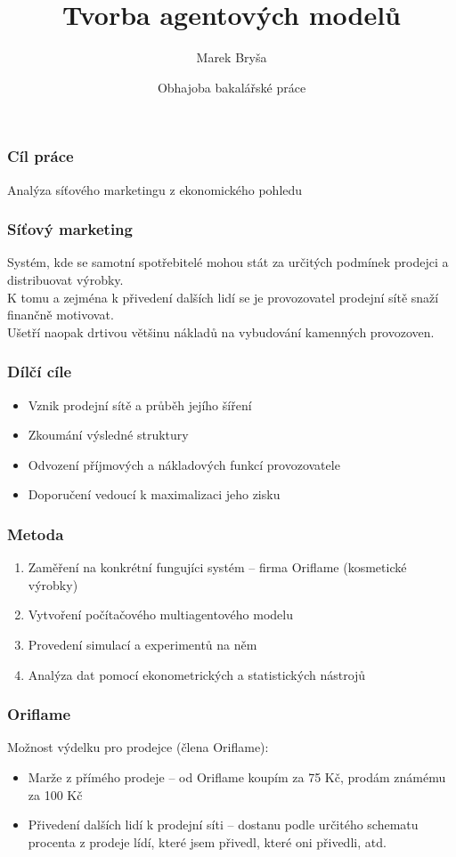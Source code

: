 \documentclass[xcolor=dvipsnames]{beamer}
\title{Tvorba agentových modelů}
\author{Marek Bryša}
\institute
{
Masarykova Univerzita\\
Přírodovědecká fakulta\\
Ústav matematiky a statistiky
}
\date{Obhajoba bakalářské práce}
\begin{document}
  \frame{\titlepage}
  \begin{frame}
    \frametitle{Cíl práce}
    Analýza síťového marketingu z ekonomického pohledu\\
  \end{frame}
  \begin{frame}
    \frametitle{Síťový marketing}
    Systém, kde se samotní spotřebitelé mohou stát za určitých podmínek prodejci
a distribuovat výrobky.\\
    K tomu a zejména k přivedení dalších lidí se je provozovatel prodejní sítě snaží finančně motivovat.\\
    Ušetří naopak drtivou většinu nákladů na vybudování kamenných provozoven. 
  \end{frame}
  \begin{frame}
    \frametitle{Dílčí cíle}
    \begin{itemize}
      \item Vznik prodejní sítě a průběh jejího šíření
      \item Zkoumání výsledné struktury
      \item Odvození příjmových a nákladových funkcí provozovatele
      \item Doporučení vedoucí k maximalizaci jeho zisku
    \end{itemize}
  \end{frame}
  \begin{frame}
    \frametitle{Metoda}
    \begin{enumerate}
      \item Zaměření na konkrétní fungujíci systém -- firma Oriflame (kosmetické výrobky)
      \item Vytvoření počítačového multiagentového modelu
      \item Provedení simulací a experimentů na něm
      \item Analýza dat pomocí ekonometrických a statistických nástrojů

    \end{enumerate}

  \end{frame}
  \begin{frame}
    \frametitle{Oriflame}
    Možnost výdelku pro prodejce (člena Oriflame):
    \begin{itemize}
      \item Marže z přímého prodeje -- od Oriflame koupím za 75 Kč, prodám známému za 100 Kč
      \item Přivedení dalších lidí k prodejní síti -- dostanu podle určitého schematu procenta z prodeje lídí, které jsem přivedl, které oni přivedli, atd.
    \end{itemize}
  \end{frame}
\end{document}
